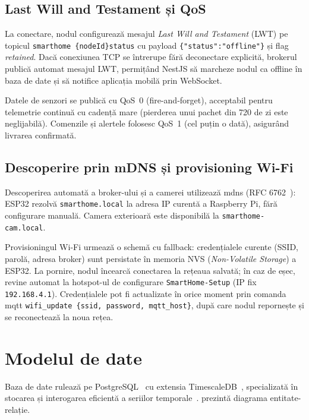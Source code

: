 \subsection{Last Will and Testament și QoS}

La conectare, nodul configurează mesajul \emph{Last Will and Testament} (LWT) pe topicul
\texttt{smarthome\slb{} \{nodeId\}\slb{}status} cu payload \texttt{\{"status":"offline"\}} și flag
\emph{retained}. Dacă conexiunea TCP se întrerupe fără deconectare explicită, brokerul
publică automat mesajul LWT, permițând NestJS să marcheze nodul ca offline în baza
de date și să notifice aplicația mobilă prin WebSocket.

Datele de senzori se publică cu QoS~0 (fire-and-forget), acceptabil pentru telemetrie
continuă cu cadență mare (pierderea unui pachet din 720 de zi este neglijabilă).
Comenzile și alertele folosesc QoS~1 (cel puțin o dată), asigurând livrarea
confirmată.

\subsection{Descoperire prin mDNS și provisioning Wi-Fi}

Descoperirea automată a broker-ului și a camerei utilizează \gls{mdns} (RFC 6762~\cite{rfc6762mdns}):
ESP32 rezolvă \texttt{smarthome.local} la adresa IP curentă a Raspberry Pi, fără
configurare manuală. Camera exterioară este disponibilă la \texttt{smarthome-cam.local}.

Provisioningul Wi-Fi urmează o schemă cu fallback: credențialele curente (SSID, parolă,
adresa broker) sunt persistate în memoria NVS (\emph{Non-Volatile Storage}) a ESP32.
La pornire, nodul încearcă conectarea la rețeaua salvată; în caz de eșec, revine automat
la hotspot-ul de configurare \texttt{SmartHome-Setup} (IP fix \texttt{192.168.4.1}).
Credențialele pot fi actualizate în orice moment prin comanda \gls{mqtt}
\texttt{wifi\_update \{ssid, password, mqtt\_host\}}, după care nodul repornește
și se reconectează la noua rețea.

\section{Modelul de date}
\label{sec:model-date}

Baza de date rulează pe PostgreSQL~\cite{postgresql2024} cu extensia
TimescaleDB~\cite{timescaledb2017}, specializată în stocarea și interogarea eficientă
a seriilor temporale~\cite{jensen2017timeseries}.  prezintă diagrama
entitate-relație.

